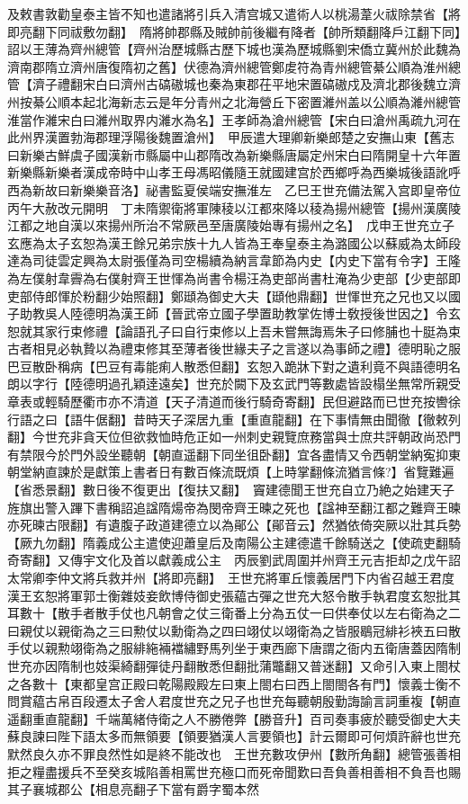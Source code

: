 及敕書敦勸皇泰主皆不知也遣諸將引兵入清宫城又遣術人以桃湯葦火祓除禁省【將即亮翻下同祓敷勿翻】　隋將帥郡縣及賊帥前後繼有降者【帥所類翻降戶江翻下同】詔以王薄為齊州總管【齊州治歷城縣古歷下城也漢為歷城縣劉宋僑立冀州於此魏為濟南郡隋立濟州唐復隋初之舊】伏德為濟州總管鄭䖍符為青州總管綦公順為淮州總管【濟子禮翻宋白曰濟州古碻磝城也秦為東郡茌平地宋置碻磝戍及濟北郡後魏立濟州按綦公順本起北海新志云是年分青州之北海營丘下密置濰州盖以公順為濰州總管淮當作濰宋白曰濰州取界内濰水為名】王孝師為滄州總管【宋白曰滄州禹疏九河在此州界漢置勃海郡理浮陽後魏置滄州】　甲辰遣大理卿新樂郎楚之安撫山東【舊志曰新樂古鮮虞子國漢新市縣屬中山郡隋改為新樂縣唐屬定州宋白曰隋開皇十六年置新樂縣新樂者漢成帝時中山孝王母馮昭儀隨王就國建宫於西鄉呼為西樂城後語訛呼西為新故曰新樂樂音洛】祕書監夏侯端安撫淮左　乙巳王世充備法駕入宫即皇帝位丙午大赦改元開明　丁未隋禦衛將軍陳稜以江都來降以稜為揚州總管【揚州漢廣陵江都之地自漢以來揚州所治不常厥邑至唐廣陵始專有揚州之名】　戊申王世充立子玄應為太子玄恕為漢王餘兄弟宗族十九人皆為王奉皇泰主為潞國公以蘇威為太師段達為司徒雲定興為太尉張僅為司空楊續為納言韋節為内史【内史下當有令字】王隆為左僕射韋霽為右僕射齊王世惲為尚書令楊汪為吏部尚書杜淹為少吏部【少吏部即吏部侍郎惲於粉翻少始照翻】鄭頲為御史大夫【頲他鼎翻】世惲世充之兄也又以國子助教吳人陸德明為漢王師【晉武帝立國子學置助教掌佐博士敎授後世因之】令玄恕就其家行束修禮【論語孔子曰自行束修以上吾未嘗無誨焉朱子曰修脯也十脡為束古者相見必執贄以為禮束修其至薄者後世緣夫子之言遂以為事師之禮】德明恥之服巴豆散卧稱病【巴豆有毒能痢人散悉但翻】玄恕入跪牀下對之遺利竟不與語德明名朗以字行【陸德明過孔穎逹遠矣】世充於闕下及玄武門等數處皆設榻坐無常所親受章表或輕騎歷衢市亦不清道【天子清道而後行騎奇寄翻】民但避路而已世充按轡徐行語之曰【語牛倨翻】昔時天子深居九重【重直龍翻】在下事情無由聞徹【徹敕列翻】今世充非貪天位但欲救恤時危正如一州刺史親覽庶務當與士庶共評朝政尚恐門有禁限今於門外設坐聽朝【朝直遥翻下同坐徂卧翻】宜各盡情又令西朝堂納寃抑東朝堂納直諫於是獻策上書者日有數百條流既煩【上時掌翻條流猶言條?】省覽難遍【省悉景翻】數日後不復更出【復扶又翻】　竇建德聞王世充自立乃絶之始建天子旌旗出警入蹕下書稱詔追諡隋煬帝為閔帝齊王暕之死也【諡神至翻江都之難齊王暕亦死暕古限翻】有遺腹子政道建德立以為鄖公【鄖音云】然猶依倚突厥以壯其兵勢【厥九勿翻】隋義成公主遣使迎蕭皇后及南陽公主建德遣千餘騎送之【使疏吏翻騎奇寄翻】又傳宇文化及首以獻義成公主　丙辰劉武周圍并州齊王元吉拒却之戊午詔太常卿李仲文將兵救并州【將即亮翻】　王世充將軍丘懷義居門下内省召越王君度漢王玄恕將軍郭士衡雜妓妾飲博侍御史張藴古彈之世充大怒令散手執君度玄恕批其耳數十【散手者散手仗也凡朝會之仗三衛番上分為五仗一曰供奉仗以左右衛為之二曰親仗以親衛為之三曰勲仗以勳衛為之四曰翊仗以翊衛為之皆服鶡冠緋衫裌五曰散手仗以親勲翊衛為之服緋絁裲襠繡野馬列坐于東西廊下唐謂之衙内五衛唐蓋因隋制世充亦因隋制也妓渠綺翻彈徒丹翻散悉但翻批蒲鼈翻又普迷翻】又命引入東上閤杖之各數十【東都皇宫正殿曰乾陽殿殿左曰東上閤右曰西上閤閤各有門】懷義士衡不問賞藴古帛百段遷太子舍人君度世充之兄子也世充每聽朝殷勤誨諭言詞重複【朝直遥翻重直龍翻】千端萬緒侍衛之人不勝倦弊【勝音升】百司奏事疲於聽受御史大夫蘇良諫曰陛下語太多而無領要【領要猶漢人言要領也】計云爾即可何煩許辭也世充默然良久亦不罪良然性如是終不能改也　王世充數攻伊州【數所角翻】總管張善相拒之糧盡援兵不至癸亥城陷善相罵世充極口而死帝聞歎曰吾負善相善相不負吾也賜其子襄城郡公【相息亮翻子下當有爵字蜀本然